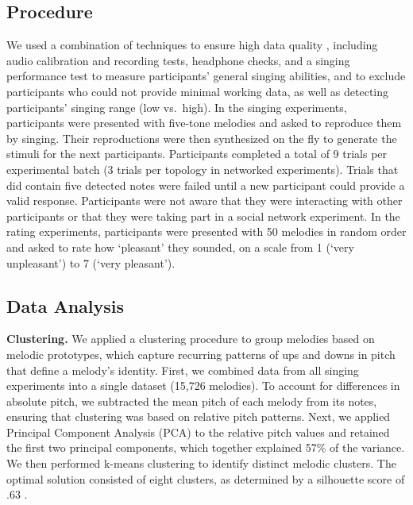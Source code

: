 \documentclass[10pt,letterpaper]{article}
\begin{document}
\subsection{Procedure}
We used a combination of techniques to ensure high data quality \cite{anglada2022repp, anglada2023large,woods2017headphone}, including audio calibration and recording tests, headphone checks, and a singing performance test to measure participants' general singing abilities, and to exclude participants who could not provide minimal working data, as well as detecting participants' singing range (low vs.~high). In the singing experiments, participants were presented with five-tone melodies and asked to reproduce them by singing. Their reproductions were then synthesized on the fly to generate the stimuli for the next participants. Participants completed a total of 9 trials per experimental batch (3 trials per topology in networked experiments). Trials that did contain five detected notes were failed until a new participant could provide a valid response. Participants were not aware that they were interacting with other participants or that they were taking part in a social network experiment. In the rating experiments, participants were presented with 50 melodies in random order and asked to rate how `pleasant' they sounded, on a scale from 1 (`very unpleasant') to 7 (`very pleasant').



\subsection{Data Analysis}
\noindent\textbf{Clustering.}
We applied a clustering procedure to group melodies based on melodic prototypes, which capture recurring patterns of ups and downs in pitch that define a melody’s identity. First, we combined data from all singing experiments into a single dataset (15,726 melodies). To account for differences in absolute pitch, we subtracted the mean pitch of each melody from its notes, ensuring that clustering was based on relative pitch patterns. Next, we applied Principal Component Analysis (PCA) to the relative pitch values and retained the first two principal components, which together explained 57\% of the variance. We then performed k-means clustering \cite{macqueen1967some} to identify distinct melodic clusters. The optimal solution consisted of eight clusters, as determined by a silhouette score of .63 \cite{rousseeuw1987silhouettes}. 
\end{document}
